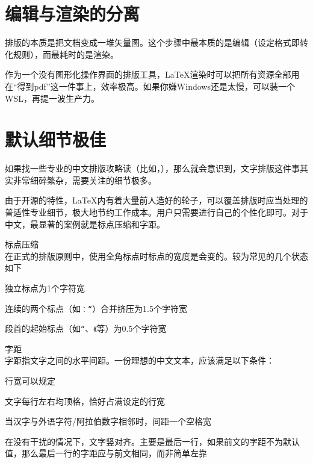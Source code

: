 \documentclass[10pt,openany]{book}
\begin{document}
\begin{sloppypar}
    \section{编辑与渲染的分离}

    排版的本质是把文档变成一堆矢量图。这个步骤中最本质的是编辑（设定格式即转化规则），而最耗时的是渲染。

    作为一个没有图形化操作界面的排版工具，{\LaTeX}渲染时可以把所有资源全部用在“得到pdf”这一件事上，效率极高。如果你嫌Windows还是太慢，可以装一个WSL，再提一波生产力。

    \section{默认细节极佳}

    如果找一些专业的中文排版攻略读（比如，），那么就会意识到，文字排版这件事其实非常细碎繁杂，需要关注的细节极多。

    由于开源的特性，{\LaTeX}内有着大量前人造好的轮子，可以覆盖排版时应当处理的普适性专业细节，极大地节约工作成本。用户只需要进行自己的个性化即可。对于中文，最显著的案例就是标点压缩和字距。

    \begin{tightitem}
        \item 标点压缩\\在正式的排版原则中，使用全角标点时标点的宽度是会变的。较为常见的几个状态如下
        \begin{tightenum}
            \item 独立标点为1个字符宽
            \item 连续的两个标点（如\texttt{：“}）合并挤压为1.5个字符宽
            \item 段首的起始标点（如\texttt{“}、\texttt{《}等）为0.5个字符宽
        \end{tightenum}
        \item 字距\\字距指文字之间的水平间距。一份理想的中文文本，应该满足以下条件：
        \begin{tightenum}
            \item 行宽可以规定
            \item 文字每行左右均顶格，恰好占满设定的行宽
            \item 当汉字与外语字符/阿拉伯数字相邻时，间距一个空格宽
            \item 在没有干扰的情况下，文字竖对齐。主要是最后一行，如果前文的字距不为默认值，那么最后一行的字距应与前文相同，而非简单左靠
        \end{tightenum}
    \end{tightitem}


\end{sloppypar}
\end{document}
